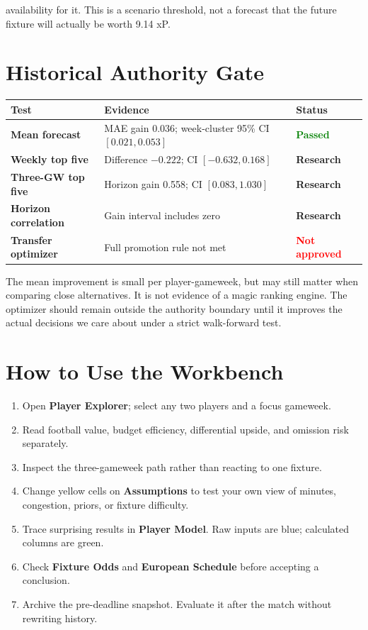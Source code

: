 \documentclass[11pt,a4paper]{article}
\newcommand{\pass}{\textcolor{Green}{\textbf{Passed}}}
\newcommand{\research}{\textcolor{Amber}{\textbf{Research}}}
\newcommand{\fail}{\textcolor{Red}{\textbf{Not approved}}}
\begin{document}
availability for it. This is a scenario threshold, not a forecast that the future fixture will actually be worth 9.14 xP.

\section{Historical Authority Gate}

\begin{center}
\begin{tabularx}{0.96\textwidth}{>{\bfseries}l X l}
\toprule
Test & Evidence & Status\\
\midrule
Mean forecast & MAE gain 0.036; week-cluster 95\% CI $[0.021,0.053]$ & \pass\\
Weekly top five & Difference $-0.222$; CI $[-0.632,0.168]$ & \research\\
Three-GW top five & Horizon gain 0.558; CI $[0.083,1.030]$ & \research\\
Horizon correlation & Gain interval includes zero & \research\\
Transfer optimizer & Full promotion rule not met & \fail\\
\bottomrule
\end{tabularx}
\end{center}

The mean improvement is small per player-gameweek, but may still matter when comparing close alternatives. It is not evidence of a magic ranking engine. The optimizer should remain outside the authority boundary until it improves the actual decisions we care about under a strict walk-forward test.

\section{How to Use the Workbench}

\begin{enumerate}
  \item Open \textbf{Player Explorer}; select any two players and a focus gameweek.
  \item Read football value, budget efficiency, differential upside, and omission risk separately.
  \item Inspect the three-gameweek path rather than reacting to one fixture.
  \item Change yellow cells on \textbf{Assumptions} to test your own view of minutes, congestion, priors, or fixture difficulty.
  \item Trace surprising results in \textbf{Player Model}. Raw inputs are blue; calculated columns are green.
  \item Check \textbf{Fixture Odds} and \textbf{European Schedule} before accepting a conclusion.
  \item Archive the pre-deadline snapshot. Evaluate it after the match without rewriting history.
\end{enumerate}
\end{document}
